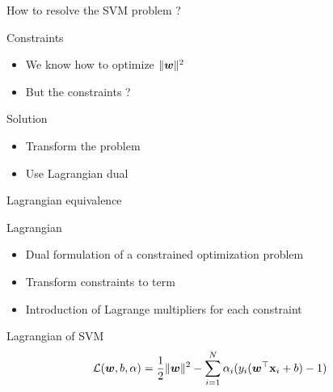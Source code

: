\documentclass[11pt, pdf, compress, handout]{beamer}
\begin{document}
\begin{frame}{How to resolve the SVM problem ?}
  \begin{block}{Constraints}
    \begin{itemize}
    \item We know how to optimize $\| {\boldsymbol{w}} \|^2$
    \item But the constraints ? 
    \end{itemize}
  \end{block}
  \begin{block}{Solution }
    \begin{itemize}
    \item Transform the problem
    \item Use Lagrangian dual
    \end{itemize}
  \end{block}
\end{frame}
\begin{frame}[label={sec:org9300cdf}]{Lagrangian equivalence}
  \begin{block}{Lagrangian}
    \begin{itemize}
    \item Dual formulation of a constrained optimization problem
    \item Transform constraints to term
    \item Introduction of Lagrange multipliers for each constraint
    \end{itemize}
  \end{block}
  \begin{block}{Lagrangian of SVM}
    $$
    {\mathcal{L}}({\boldsymbol{w}},b,\alpha) = \frac{1}{2} \| {\boldsymbol{w}} \|^2 - \sum_{i = 1}^N
    \alpha_i (y_i({\boldsymbol{w}}^\top {\mathbf{x}}_i +b) - 1)
    $$
  \end{block}
\end{frame}
\end{document}
